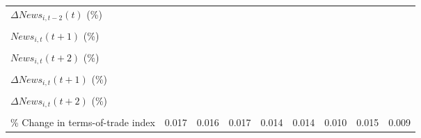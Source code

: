 {\begin{tabular}{l*{8}{c}}
\addlinespace
$ \Delta News_{i,t-2}(t)$ (\%)&                     &                     &                     &                     &                     &                     &                     &                     \\
                    &                     &                     &                     &                     &                     &                     &                     &                     \\
\addlinespace
$ News_{i,t}(t+1)$ (\%)&                     &                     &                     &                     &                     &                     &                     &                     \\
                    &                     &                     &                     &                     &                     &                     &                     &                     \\
\addlinespace
$ News_{i,t}(t+2)$ (\%)&                     &                     &                     &                     &                     &                     &                     &                     \\
                    &                     &                     &                     &                     &                     &                     &                     &                     \\
\addlinespace
$ \Delta News_{i,t}(t+1)$ (\%)&                     &                     &                     &                     &                     &                     &                     &                     \\
                    &                     &                     &                     &                     &                     &                     &                     &                     \\
\addlinespace
$ \Delta News_{i,t}(t+2)$ (\%)&                     &                     &                     &                     &                     &                     &                     &                     \\
                    &                     &                     &                     &                     &                     &                     &                     &                     \\
\addlinespace
\% Change in terms-of-trade index&       0.017         &       0.016         &       0.017         &       0.014         &       0.014         &       0.010         &       0.015         &       0.009         \\

\end{tabular}}
